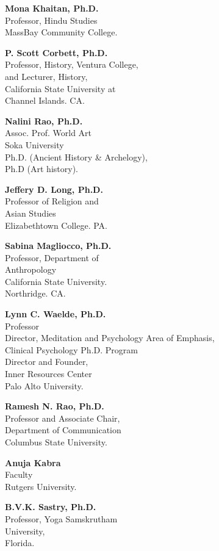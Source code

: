 \begin{multicols}{2}
\begin{trivlist}
\item \textbf{Mona Khaitan, Ph.D.}\\ 
Professor, Hindu Studies\\
MassBay Community College.
 
\item \textbf{P. Scott Corbett, Ph.D.}\\ 
Professor, History, Ventura College,\\ 
and Lecturer, History,\\ 
California State University at\\ 
Channel Islands. CA. 
 
\item \textbf{Nalini Rao, Ph.D.}\\ 
Assoc. Prof. World Art\\
Soka University\\
Ph.D. (Ancient History \& Archelogy),\\ Ph.D (Art history).
\vfill
 
\item \textbf{Jeffery D. Long, Ph.D.}\\ 
Professor of Religion and\\ Asian Studies\\
Elizabethtown College. PA.
 
\item \textbf{Sabina Magliocco, Ph.D.}\\ 
Professor, Department of\\ Anthropology\\
California State University.\\ Northridge. CA. 
 
\item \textbf{Lynn C. Waelde, Ph.D.}\\ 
Professor\\
Director, Meditation and Psychology Area of Emphasis,\\[2pt] 
Clinical Psychology Ph.D. Program\\[2pt]
Director and Founder,\\ Inner Resources Center\\[2pt]
Palo Alto University.
 
\item \textbf{Ramesh N. Rao, Ph.D.}\\ 
Professor and Associate Chair,\\
Department of Communication\\
Columbus State University.
 
\item \textbf{Anuja Kabra}\\ 
Faculty\\
Rutgers University.
 
\item \textbf{B.V.K. Sastry, Ph.D.}\\ 
Professor, Yoga Samskrutham\\ University,\\ 
Florida. 
\end{trivlist}
\end{multicols}

